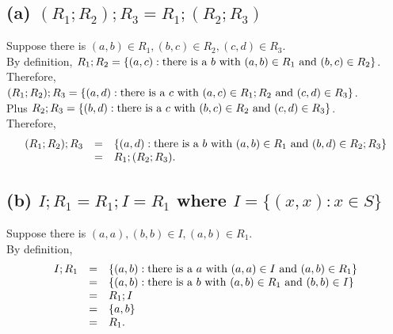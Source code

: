 \documentclass[]{article}
\begin{document}
\begin{spacing}{1.5}
\subsection*{(a) $ (R_1; R_2) ; R_3 = R_1 ; (R_2; R_3)$} 
Suppose there is $ (a, b) \in R_1, (b, c) \in R_2, (c, d) \in R_3 $.\\
By definition, $ R_1; R_2 = \{(a, c) : \text{there is a $ b $ with } (a, b) \in R_1 \text{ and } (b, c) \in R_2\} $.\\
Therefore, $ (R_1; R_2) ; R_3 = \{(a, d) : \text{there is a $ c $ with } (a, c) \in R_1; R_2 \text{ and } (c, d) \in R_3\} $.\\
Plus $ R_2; R_3 = \{(b, d) : \text{there is a $ c $ with } (b, c) \in R_2 \text{ and } (c, d) \in R_3\} $.\\
Therefore, 
\[
\begin{array}{rcl}
	(R_1; R_2) ; R_3 &=& \{(a, d) : \text{there is a $ b $ with } (a, b) \in R_1 \text{ and } (b, d) \in R_2; R_3\} \\
	&=& R_1 ; (R_2; R_3).
\end{array}
\]


\subsection*{(b) $ I; R_1 = R_1; I = R_1 $ where $ I = \{(x,x):x \in S\} $}
Suppose there is $ (a, a), (b, b) \in I, (a, b) \in R_1 $.\\
By definition, 
\[\begin{array}{rcl}
	 I; R_1 &=& \{(a, b) : \text{there is a $ a $ with } (a, a) \in I \text{ and } (a, b) \in R_1\} \\
	&=& \{(a, b) : \text{there is a $ b $ with } (a, b) \in R_1 \text{ and } (b, b) \in I \} \\
	&=& R_1; I\\
	&=& \{a, b\}\\
	&=& R_1.
\end{array}\]


\end{spacing}
\end{document}
